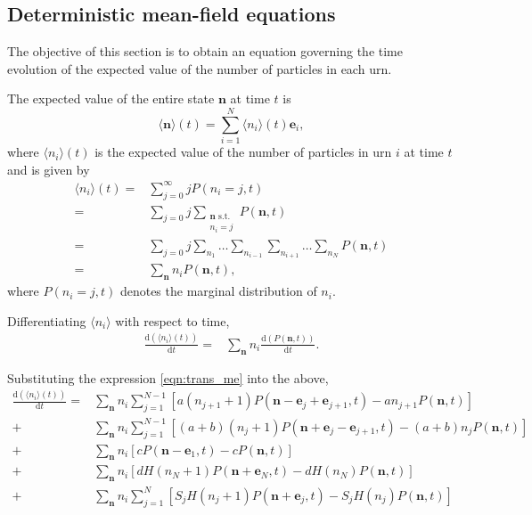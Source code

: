 \documentclass[a4paper,11pt]{article}
\numberwithin{equation}{section}
\newcommand{\diff}[2]{\frac{\mathrm{d} #1}{\mathrm{d} #2}}
\newcommand{\V}[1]{\mathbf{#1}}
\newcommand{\E}[1]{\langle #1 \rangle}
\begin{document}
\subsection{Deterministic mean-field equations}
The objective of this section is to obtain an equation governing the time
evolution of the expected value of the number of particles in each urn.

The expected value of the entire state \(\V{n}\) at time \(t\) is
\begin{equation*}
    \E{\V{n}}(t) = \sum_{i=1}^N \langle n_i \rangle(t) \V{e}_i,
\end{equation*}
where \(\E{n_i}(t)\) is the expected value of the number of particles in urn
\(i\) at time \(t\) and is given by
\begin{align*}
    \E{n_i}(t) =& \sum_{j=0}^\infty j P(n_i = j,t)\\
    =& \sum_{j=0} j
    \sum_{\substack{\V{n} \text{ s.t.} \\ n_i=j}} P(\V{n},t)\\
    =& \sum_{j=0} j
    \sum_{n_1} \dotso \sum_{n_{i-1}} \sum_{n_{i+1}} \dotso \sum_{n_N} P(\V{n},t)\\
    =& \sum_{\V{n}} n_i P(\V{n},t),
\end{align*}
where \(P(n_i = j,t)\) denotes the marginal distribution of \(n_i\).

Differentiating \(\E{n_i}\) with respect to time,
\begin{align*}
    \diff{(\E{n_i}(t))}{t} =& \sum_{\V{n}} n_i \diff{(P(\V{n},t))}{t}.
\end{align*}

Substituting the expression \eqref{eqn:trans_me} into the above,
\begin{subequations}
\begin{align}
    \label{eqn:trans_expectation_hl_term}
    \diff{(\E{n_i}(t))}{t}
    = & \sum_\V{n} n_i \sum_{j=1}^{N-1}
    \left[a(n_{j+1}+1) P(\V{n} - \V{e}_j + \V{e}_{j+1},t) -
        an_{j+1} P(\V{n},t)\right] \\
    \label{eqn:trans_expectation_hr_term}
    + & \sum_\V{n} n_i \sum_{j=1}^{N-1}
    \left[(a+b)(n_j+1) P(\V{n} + \V{e}_j - \V{e}_{j+1},t) -
        (a+b)n_j P(\V{n},t)\right] \\
    \label{eqn:trans_expectation_in_term}
    + & \sum_\V{n} n_i
    \left[c P(\V{n} - \V{e}_1,t) - c P(\V{n},t)\right] \\
    \label{eqn:trans_expectation_out_term}
    + & \sum_\V{n} n_i
    \left[d H(n_N+1) P(\V{n} + \V{e}_N,t) - d H(n_N) P(\V{n},t)\right] \\
    \label{eqn:trans_expectation_rem_term}
    + & \sum_\V{n} n_i \sum_{j=1}^{N}
    \left[S_j H(n_j + 1) P(\V{n} + \V{e}_j,t) - S_j H(n_j) P(\V{n},t)\right]
\end{align}
\end{subequations}
\end{document}
